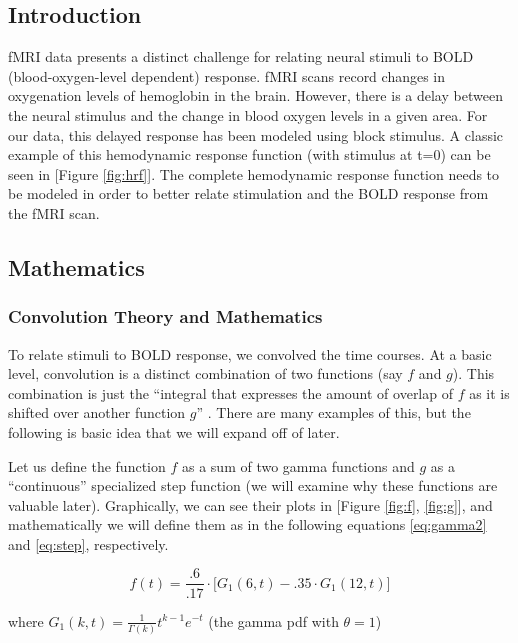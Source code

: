 
\subsection{Introduction}

fMRI data presents a distinct challenge for relating neural stimuli 
to BOLD (blood-oxygen-level dependent) response. fMRI scans record changes 
in oxygenation levels of hemoglobin in the brain. However, there is a delay 
between the neural stimulus and the change in blood oxygen levels in a given 
area. For our data, this delayed response has been modeled using block stimulus. 
A classic example of this hemodynamic response function (with stimulus at t=0) 
can be seen in [Figure \ref{fig:hrf}]. The complete hemodynamic response 
function needs to be modeled in order to better relate stimulation and the BOLD 
response from the fMRI scan.

\subsection{Mathematics}
\subsubsection{Convolution Theory and Mathematics}

To relate stimuli to BOLD response, we convolved the time courses. At a basic 
level, convolution is a distinct combination of two functions (say $f$ and $g$). 
This combination is just the ``integral that expresses the amount of overlap of 
$f$ as it is shifted over another function $g$'' \cite{weissten2015convolution}. 
There are many examples of this, but the following is basic idea that we will 
expand off of later. 

Let us define the function $f$ as a sum of two gamma functions and $g$ as a 
``continuous'' specialized step function (we will examine why these functions are 
valuable later). Graphically, we can see their plots in [Figure \ref{fig:f}, 
\ref{fig:g}], and mathematically we will define them as in the following 
equations \ref{eq:gamma2} and \ref{eq:step}, respectively.

\begin{equation} \label{eq:gamma2}
f(t)=\frac{.6}{.17}\cdot  \big[G_1(6,t)-.35 \cdot G_1(12,t) \big]
\end{equation}

where $G_1(k,t) =\frac{1}{\Gamma(k)} t^{k-1} e^{-t}$ (the gamma pdf with 
$\theta =1$)

